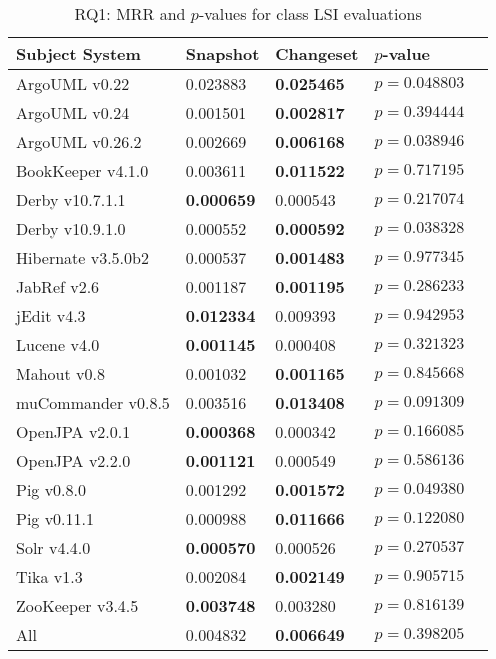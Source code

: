 
\begin{table}[t]
\renewcommand{\arraystretch}{1.3}
\footnotesize
\centering
\caption{RQ1: MRR and $p$-values for class LSI evaluations}
\begin{tabular}{l|ll|ll}
   \toprule
    Subject System & Snapshot & Changeset & $p$-value  \\
    \midrule

ArgoUML v0.22 & 0.023883 & {\bf 0.025465 } & $p = 0.048803$ \\
ArgoUML v0.24 & 0.001501 & {\bf 0.002817 } & $p = 0.394444$ \\
ArgoUML v0.26.2 & 0.002669 & {\bf 0.006168 } & $p = 0.038946$ \\
BookKeeper v4.1.0 & 0.003611 & {\bf 0.011522 } & $p = 0.717195$ \\
Derby v10.7.1.1 & {\bf 0.000659 } & 0.000543 & $p = 0.217074$ \\
Derby v10.9.1.0 & 0.000552 & {\bf 0.000592 } & $p = 0.038328$ \\
Hibernate v3.5.0b2 & 0.000537 & {\bf 0.001483 } & $p = 0.977345$ \\
JabRef v2.6 & 0.001187 & {\bf 0.001195 } & $p = 0.286233$ \\
jEdit v4.3 & {\bf 0.012334 } & 0.009393 & $p = 0.942953$ \\
Lucene v4.0 & {\bf 0.001145 } & 0.000408 & $p = 0.321323$ \\
Mahout v0.8 & 0.001032 & {\bf 0.001165 } & $p = 0.845668$ \\
muCommander v0.8.5 & 0.003516 & {\bf 0.013408 } & $p = 0.091309$ \\
OpenJPA v2.0.1 & {\bf 0.000368 } & 0.000342 & $p = 0.166085$ \\
OpenJPA v2.2.0 & {\bf 0.001121 } & 0.000549 & $p = 0.586136$ \\
Pig v0.8.0 & 0.001292 & {\bf 0.001572 } & $p = 0.049380$ \\
Pig v0.11.1 & 0.000988 & {\bf 0.011666 } & $p = 0.122080$ \\
Solr v4.4.0 & {\bf 0.000570 } & 0.000526 & $p = 0.270537$ \\
Tika v1.3 & 0.002084 & {\bf 0.002149 } & $p = 0.905715$ \\
ZooKeeper v3.4.5 & {\bf 0.003748 } & 0.003280 & $p = 0.816139$ \\
\midrule
All & 0.004832 & {\bf 0.006649 } & $p = 0.398205$ \\

    \bottomrule
\end{tabular}
\label{table:rq1:class:lsi}
\end{table}


